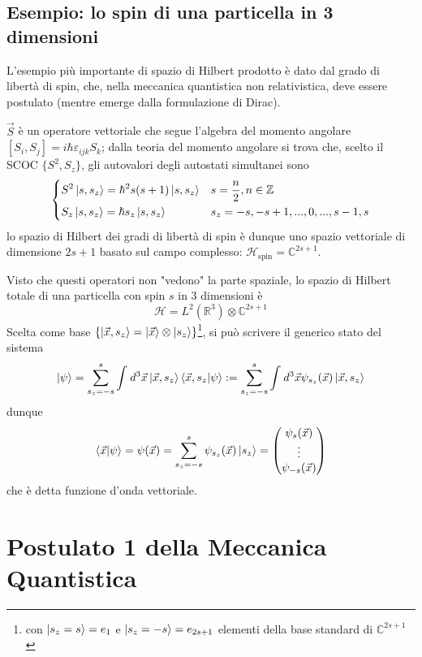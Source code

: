 \subsection{Esempio: lo spin di una particella in 3 dimensioni}
L'esempio più importante di spazio di Hilbert prodotto è dato dal grado di libertà di spin,
che, nella meccanica quantistica non relativistica, deve essere postulato (mentre emerge dalla
formulazione di Dirac).

$\vec{S}$ è un operatore vettoriale che segue l'algebra del momento angolare
$[S_i,S_j] = i\hbar\varepsilon_{ijk}S_k$; dalla teoria del momento angolare si trova che, scelto il SCOC
$\{S^2,S_z\}$, gli autovalori degli autostati simultanei sono
$$
\begin{dcases}
    S^2\ket{s,s_z} = \hbar^2s(s+1)\ket{s,s_z} & s = \frac{n}{2}, n\in\mathbb{Z} \\
    S_z\ket{s,s_z} = \hbar s_z\ket{s,s_z} & s_z = -s,-s+1,...,0,...,s-1,s\\
\end{dcases}
$$
lo spazio di Hilbert dei gradi di libertà di spin è dunque uno spazio vettoriale di dimensione
$2s+1$ basato sul campo complesso: $\mathcal{H}_\text{spin} = \mathbb{C}^{2s+1}$.

Visto che questi operatori non "vedono" la parte spaziale, lo spazio di Hilbert totale di una
particella con spin $s$ in 3 dimensioni è
$$ \mathcal{H} = L^2(\mathbb{R}^3) \otimes \mathbb{C}^{2s+1}$$
Scelta come base $\{ \ket{\vec{x},s_z} = \ket{\vec{x}}\otimes\ket{s_z} \}$\footnote{con
$\ket{s_z = s} = e_1$ e $\ket{s_z=-s} = e_{2s+1}$ elementi della base standard di $\mathbb{C}^{2s+1}$},
si può scrivere il generico stato del sistema
$$\ket{\psi} = \sum_{s_z=-s}^{s}\int_{}^{}d^3\vec{x} \ket{\vec{x},s_z}\bra{\vec{x},s_z}\ket{\psi}
:= \sum_{s_z=-s}^{s}\int_{}^{}d^3\vec{x} \psi_{s_z}(\vec{x})\ket{\vec{x},s_z}$$
dunque
$$ \bra{\vec{x}}\ket{\psi}=\psi(\vec{x}) = \sum_{s_z=-s}^{s}\psi_{s_z}(\vec{x})\ket{s_z} =
    \begin{pmatrix}
	\psi_s(\vec{x}) \\
	\vdots \\
	\psi_{-s}(\vec{x})
    \end{pmatrix}$$
che è detta funzione d'onda vettoriale.

\section{Postulato 1 della Meccanica Quantistica}
\noindent{}

